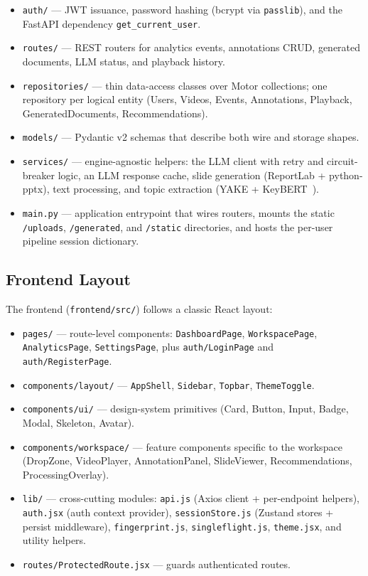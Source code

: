 \documentclass[conference]{IEEEtran}
\begin{document}
\begin{itemize}
    \item \texttt{auth/} --- JWT issuance, password hashing (bcrypt via \texttt{passlib}), and the FastAPI dependency \texttt{get\_current\_user}.
    \item \texttt{routes/} --- REST routers for analytics events, annotations CRUD, generated documents, LLM status, and playback history.
    \item \texttt{repositories/} --- thin data-access classes over Motor collections; one repository per logical entity (Users, Videos, Events, Annotations, Playback, GeneratedDocuments, Recommendations).
    \item \texttt{models/} --- Pydantic v2 schemas that describe both wire and storage shapes.
    \item \texttt{services/} --- engine-agnostic helpers: the LLM client with retry and circuit-breaker logic, an LLM response cache, slide generation (ReportLab + python-pptx), text processing, and topic extraction (YAKE + KeyBERT~\cite{keybert}).
    \item \texttt{main.py} --- application entrypoint that wires routers, mounts the static \texttt{/uploads}, \texttt{/generated}, and \texttt{/static} directories, and hosts the per-user pipeline session dictionary.
\end{itemize}

\subsection{Frontend Layout}

The frontend (\texttt{frontend/src/}) follows a classic React layout:

\begin{itemize}
    \item \texttt{pages/} --- route-level components: \texttt{DashboardPage}, \texttt{WorkspacePage}, \texttt{AnalyticsPage}, \texttt{SettingsPage}, plus \texttt{auth/LoginPage} and \texttt{auth/RegisterPage}.
    \item \texttt{components/layout/} --- \texttt{AppShell}, \texttt{Sidebar}, \texttt{Topbar}, \texttt{ThemeToggle}.
    \item \texttt{components/ui/} --- design-system primitives (Card, Button, Input, Badge, Modal, Skeleton, Avatar).
    \item \texttt{components/workspace/} --- feature components specific to the workspace (DropZone, VideoPlayer, AnnotationPanel, SlideViewer, Recommendations, ProcessingOverlay).
    \item \texttt{lib/} --- cross-cutting modules: \texttt{api.js} (Axios client + per-endpoint helpers), \texttt{auth.jsx} (auth context provider), \texttt{sessionStore.js} (Zustand stores + persist middleware), \texttt{fingerprint.js}, \texttt{singleflight.js}, \texttt{theme.jsx}, and utility helpers.
    \item \texttt{routes/ProtectedRoute.jsx} --- guards authenticated routes.
\end{itemize}
\end{document}
